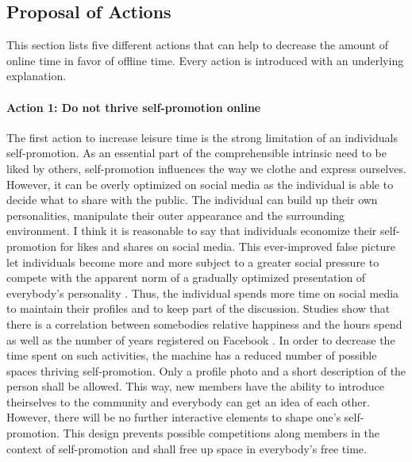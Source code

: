 \documentclass[12pt,numbers=noenddot,parskip,bibliography=totocnumbered,listof=totocnumbered]{scrreprt}
\begin{document}
\subsection{Proposal of Actions}
This section lists five different actions that can help to decrease the amount of online time in favor of offline time. Every action is introduced with an underlying explanation.

\paragraph{Action 1: Do not thrive self-promotion online}
The first action to increase leisure time is the strong limitation of an individuals self-promotion. As an essential part of the comprehensible intrinsic need to be liked by others, self-promotion influences the way we clothe and express ourselves. However, it can be overly optimized on social media as the individual is able to decide what to share with the public. The individual can build up their own personalities, manipulate their outer appearance and the surrounding environment. I think it is reasonable to say that individuals economize their self-promotion for likes and shares on social media. This ever-improved false picture let individuals become more and more subject to a greater social pressure to compete with the apparent norm of a gradually optimized presentation of everybody's personality \citep{jay2012}. Thus, the individual spends more time on social media to maintain their profiles and to keep part of the discussion. Studies show that there is a correlation between somebodies relative happiness and the hours spend as well as the number of years registered on Facebook \citep[p.119]{chou2012}.\newline
In order to decrease the time spent on such activities, the machine has a reduced number of possible spaces thriving self-promotion. Only a profile photo and a short description of the person shall be allowed. This way, new members have the ability to introduce theirselves to the community and everybody can get an idea of each other. However, there will be no further interactive elements to shape one's self-promotion. This design prevents possible competitions along members in the context of self-promotion and shall free up space in everybody's free time.
\end{document}
